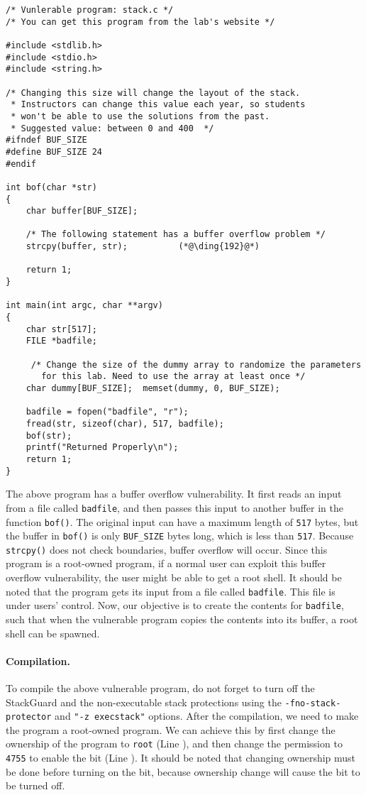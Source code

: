 \begin{lstlisting}
/* Vunlerable program: stack.c */
/* You can get this program from the lab's website */

#include <stdlib.h>
#include <stdio.h>
#include <string.h>

/* Changing this size will change the layout of the stack.
 * Instructors can change this value each year, so students
 * won't be able to use the solutions from the past.
 * Suggested value: between 0 and 400  */
#ifndef BUF_SIZE
#define BUF_SIZE 24
#endif

int bof(char *str)
{
    char buffer[BUF_SIZE];

    /* The following statement has a buffer overflow problem */ 
    strcpy(buffer, str);          (*@\ding{192}@*)

    return 1;
}

int main(int argc, char **argv)
{
    char str[517];
    FILE *badfile;

     /* Change the size of the dummy array to randomize the parameters
       for this lab. Need to use the array at least once */
    char dummy[BUF_SIZE];  memset(dummy, 0, BUF_SIZE); 

    badfile = fopen("badfile", "r");
    fread(str, sizeof(char), 517, badfile);
    bof(str);
    printf("Returned Properly\n");
    return 1;
}
\end{lstlisting}

The above program has a buffer overflow vulnerability. It first 
reads an input from a file called \texttt{badfile}, and then passes this
input to another buffer in the function {\tt bof()}. The 
original input can have a maximum length of \texttt{517} bytes, but the buffer
in {\tt bof()} is only \texttt{BUF\_SIZE} bytes long, which is less than
\texttt{517}. 
Because {\tt strcpy()} does not check
boundaries, buffer overflow will occur.
Since this program is a root-owned \setuid program, if a normal user can exploit
this buffer overflow vulnerability, the user might be 
able to get a root shell.
It should be noted that 
the program gets its input from a file called \texttt{badfile}. This file
is under users' control. Now, our objective is to 
create the contents for \texttt{badfile}, such that when the vulnerable program
copies the contents into its buffer, a root shell can be spawned.


\paragraph{Compilation.}
To compile the above vulnerable program, do not forget to 
turn off the StackGuard and the non-executable stack protections 
using the \texttt{-fno-stack-protector} and \texttt{"-z execstack"} options.
After the compilation, we need to make the program a
root-owned \setuid program. We can achieve this by first change the ownership of the program to
\texttt{root} (Line ), and then change the permission to \texttt{4755} to enable the
\setuid bit (Line ). It should be noted that changing ownership must be done before
turning on the \setuid bit, because ownership change will cause the \setuid bit to be turned
off.


